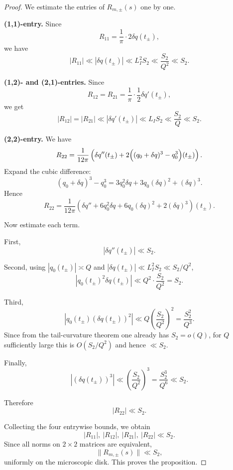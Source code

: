 \documentclass[11pt,a4paper]{amsart}
\theoremstyle{plain}
\theoremstyle{definition}
\begin{document}
\begin{proof}
We estimate the entries of $R_{m,\pm}(s)$ one by one.

\medskip
\noindent
\textbf{(1,1)-entry.}
Since
\[
R_{11}
=
\frac1\pi\cdot 2\delta q(t_\pm),
\]
we have
\[
|R_{11}|
\ll
|\delta q(t_\pm)|
\ll
L_I^2S_2
\ll
\frac{S_2}{Q^2}
\ll
S_2.
\]

\medskip
\noindent
\textbf{(1,2)- and (2,1)-entries.}
Since
\[
R_{12}=R_{21}
=
\frac1\pi\cdot \frac12 \delta q'(t_\pm),
\]
we get
\[
|R_{12}|=|R_{21}|
\ll
|\delta q'(t_\pm)|
\ll
L_I S_2
\ll
\frac{S_2}{Q}
\ll
S_2.
\]

\medskip
\noindent
\textbf{(2,2)-entry.}
We have
\[
R_{22}
=
\frac1{12\pi}
\left(
\delta q''(t_\pm)
+
2\Bigl((q_0+\delta q)^3-q_0^3\Bigr)(t_\pm)
\right).
\]
Expand the cubic difference:
\[
(q_0+\delta q)^3-q_0^3
=
3q_0^2\delta q+3q_0(\delta q)^2+(\delta q)^3.
\]
Hence
\[
R_{22}
=
\frac1{12\pi}
\left(
\delta q''
+
6q_0^2\delta q
+
6q_0(\delta q)^2
+
2(\delta q)^3
\right)(t_\pm).
\]

Now estimate each term.

First,
\[
|\delta q''(t_\pm)|\ll S_2.
\]

Second, using $|q_0(t_\pm)|\asymp Q$ and $|\delta q(t_\pm)|\ll L_I^2S_2\ll S_2/Q^2$,
\[
|q_0(t_\pm)^2\delta q(t_\pm)|
\ll
Q^2\cdot \frac{S_2}{Q^2}
=
S_2.
\]

Third,
\[
|q_0(t_\pm)(\delta q(t_\pm))^2|
\ll
Q\left(\frac{S_2}{Q^2}\right)^2
=
\frac{S_2^2}{Q^3}.
\]
Since from the tail-curvature theorem one already has $S_2=o(Q)$, for $Q$
sufficiently large this is $O(S_2/Q^2)$ and hence $\ll S_2$.

Finally,
\[
|(\delta q(t_\pm))^3|
\ll
\left(\frac{S_2}{Q^2}\right)^3
=
\frac{S_2^3}{Q^6}
\ll
S_2.
\]

Therefore
\[
|R_{22}|\ll S_2.
\]

\medskip
\noindent
Collecting the four entrywise bounds, we obtain
\[
|R_{11}|,\ |R_{12}|,\ |R_{21}|,\ |R_{22}|
\ll S_2.
\]
Since all norms on $2\times 2$ matrices are equivalent,
\[
\|R_{m,\pm}(s)\|\ll S_2,
\]
uniformly on the microscopic disk. This proves the proposition.
\end{proof}
\end{document}
